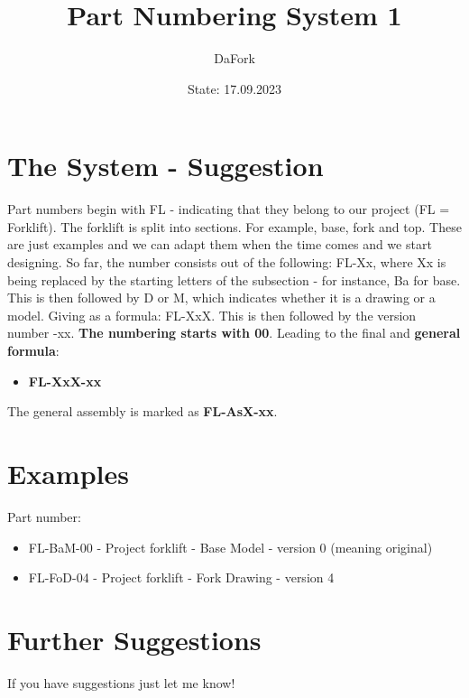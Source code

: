 \documentclass{article}
\title{Part Numbering System 1}
\author{DaFork}
\date{State: 17.09.2023}
\begin{document}
    \maketitle
    
    \section*{The System - Suggestion}
    Part numbers begin with FL - indicating that they belong to our project (FL = Forklift). 
    The forklift is split into sections. For example, base, fork and top. These are just
    examples and we can adapt them when the time comes and we start designing.
    So far, the number consists out of the following: FL-Xx, where Xx is being replaced by the starting
    letters of the subsection - for instance, Ba for base. This is then followed by D or M, which indicates
    whether it is a drawing or a model. Giving as a formula:
    FL-XxX. This is then followed by the version number -xx. \textbf{The numbering starts with 00}. Leading to the final 
    and \textbf{general formula}:

    \begin{itemize}
        \item \textbf{FL-XxX-xx}
    \end{itemize}

    The general assembly is marked as \textbf{FL-AsX-xx}.

    \section{Examples}
    Part number: 
    \begin{itemize}
        \item FL-BaM-00 - Project forklift - Base Model - version 0 (meaning original)
        \item FL-FoD-04 - Project forklift - Fork Drawing - version 4
    \end{itemize}

    \section*{Further Suggestions}
    If you have suggestions just let me know!    
\end{document}
